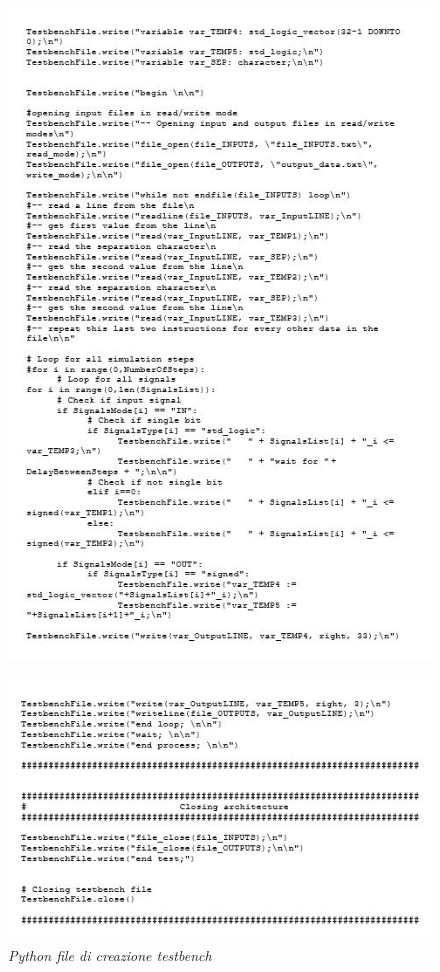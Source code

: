 \begin{figure}[!htb]
	\centering
	\includegraphics[scale=1.2]{immagini/tbgen6}
	\label{tbgen6}
\end{figure}
\begin{figure}[!htb]
	\centering
	\includegraphics[scale=1.2]{immagini/tbgen7}
	\caption{\textit{Python file di creazione testbench}}
	\label{tbgen7}
\end{figure}